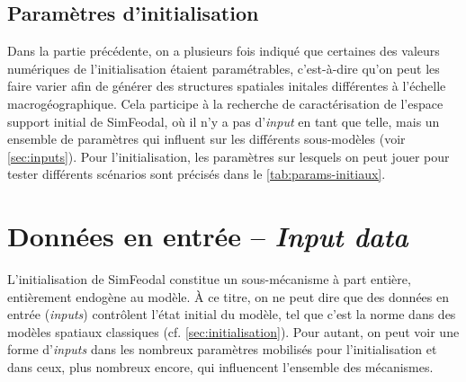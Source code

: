 
\subsection{Paramètres d'initialisation}

Dans la partie précédente, on a plusieurs fois indiqué que certaines des valeurs numériques de l'initialisation étaient paramétrables, c'est-à-dire qu'on peut les faire varier afin de générer des structures spatiales initales différentes à l'échelle macrogéographique.
Cela participe à la recherche de caractérisation de l'espace support initial de SimFeodal, où il n'y a pas d'\og \textit{input}\fg{} en tant que telle, mais un ensemble de paramètres qui influent sur les différents sous-modèles (voir \cref{sec:inputs}).
Pour l'initialisation, les paramètres sur lesquels on peut jouer pour tester différents scénarios sont précisés dans le \cref{tab:params-initiaux}.




\let\orisectionmark\sectionmark
\renewcommand\sectionmark[1]{}%
\section[Données en entrée -- \textit{Input data}]{Données en entrée -- \large{\textit{Input data}} \label{sec:inputs}}
\orisectionmark{Données en entrée}
\let\sectionmark\orisectionmark

L'initialisation de SimFeodal constitue un sous-mécanisme à part entière, entièrement endogène au modèle.
À ce titre, on ne peut dire que des données en entrée (\textit{inputs}) contrôlent l'état initial du modèle, tel que c'est la norme dans des modèles spatiaux classiques (cf. \cref{sec:initialisation}).
Pour autant, on peut voir une forme d'\textit{inputs} dans les nombreux paramètres mobilisés pour l'initialisation et dans ceux, plus nombreux encore, qui influencent l'ensemble des mécanismes.


